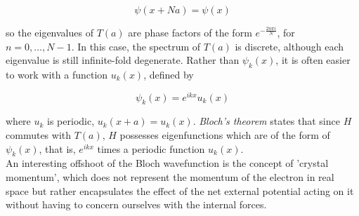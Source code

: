\begin{equation*}
    \psi(x+Na) = \psi(x)
\end{equation*}

so the eigenvalues of $T(a)$ are phase factors of the form $e^{-\frac{2n\pi i}{N}}$, for $n = 0,..., N-1$. In this case, the spectrum of $T(a)$ is discrete, although each eigenvalue is still infinite-fold degenerate. Rather than $\psi_{k}(x)$, it is often easier to work with a function $u_{k}(x)$, defined by

\begin{equation}
    \psi_{k}(x) = e^{ikx} u_{k}(x)
\end{equation}

where $u_{k}$ is periodic, $u_{k}(x+a) = u_{k}(x)$. \textit{Bloch's theorem} states that since $H$ commutes with $T(a)$, $H$ possesses eigenfunctions which are of the form of $\psi_{k}(x)$, that is, $e^{ikx}$ times a periodic function $u_{k}(x)$. \\

An interesting offshoot of the Bloch wavefunction is the concept of 'crystal momentum', which does not represent the momentum of the electron in real space but rather encapsulates the effect of the net external potential acting on it without having to concern ourselves with the internal forces. 